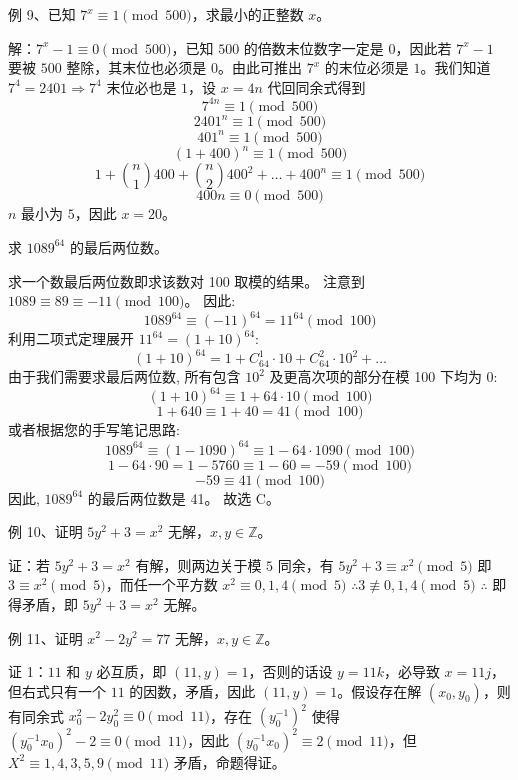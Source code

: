 \begin{questions}
\question 例 9、已知 $7^x \equiv 1 \pmod{500}$，求最小的正整数 $x$。

\begin{solution}
解：$7^x - 1 \equiv 0 \pmod{500}$，已知 $500$ 的倍数末位数字一定是 $0$，因此若 $7^x - 1$ 要被 $500$ 整除，其末位也必须是 $0$。由此可推出 $7^x$ 的末位必须是 $1$。我们知道 $7^4 = 2401 \Rightarrow 7^4$ 末位必也是 $1$，设 $x = 4n$ 代回同余式得到
\[ 7^{4n} \equiv 1 \pmod{500} \]
\[ 2401^n \equiv 1 \pmod{500} \]
\[ 401^n \equiv 1 \pmod{500} \]
\[ (1 + 400)^n \equiv 1 \pmod{500} \]
\[ 1 + \binom{n}{1}400 + \binom{n}{2}400^2 + \dots + 400^n \equiv 1 \pmod{500} \]
\[ 400n \equiv 0 \pmod{500} \]
$n$ 最小为 $5$，因此 $x = 20$。
\end{solution}

\question 求 $1089^{64}$ 的最后两位数。

\begin{solution}
求一个数最后两位数即求该数对 100 取模的结果。
注意到 $1089 \equiv 89 \equiv -11 \pmod{100}$。
因此:
\[
1089^{64} \equiv (-11)^{64} = 11^{64} \pmod{100}
\]
利用二项式定理展开 $11^{64} = (1 + 10)^{64}$:
\[
(1 + 10)^{64} = 1 + C_{64}^1 \cdot 10 + C_{64}^2 \cdot 10^2 + \dots
\]
由于我们需要求最后两位数, 所有包含 $10^2$ 及更高次项的部分在模 100 下均为 0:
\[
(1 + 10)^{64} \equiv 1 + 64 \cdot 10 \pmod{100}
\]
\[
1 + 640 \equiv 1 + 40 = 41 \pmod{100}
\]
或者根据您的手写笔记思路:
\[
1089^{64} \equiv (1 - 1090)^{64} \equiv 1 - 64 \cdot 1090 \pmod{100}
\]
\[
1 - 64 \cdot 90 = 1 - 5760 \equiv 1 - 60 = -59 \pmod{100}
\]
\[
-59 \equiv 41 \pmod{100}
\]
因此, $1089^{64}$ 的最后两位数是 41。
故选 C。
\end{solution}

\question 例 10、证明 $5y^2 + 3 = x^2$ 无解，$x, y \in \mathbb{Z}$。

\begin{solution}
证：若 $5y^2 + 3 = x^2$ 有解，则两边关于模 $5$ 同余，有 $5y^2 + 3 \equiv x^2 \pmod 5$
即 $3 \equiv x^2 \pmod 5$，而任一个平方数 $x^2 \equiv 0, 1, 4 \pmod 5$
$\therefore 3 \not\equiv 0, 1, 4 \pmod 5$ $\therefore$ 即得矛盾，即 $5y^2 + 3 = x^2$ 无解。
\end{solution}

\question 例 11、证明 $x^2 - 2y^2 = 77$ 无解，$x, y \in \mathbb{Z}$。

\begin{solution}
证 1：$11$ 和 $y$ 必互质，即 $(11, y) = 1$，否则的话设 $y = 11k$，必导致 $x = 11j$，但右式只有一个 $11$ 的因数，矛盾，因此 $(11, y) = 1$。假设存在解 $(x_0, y_0)$，则有同余式
$x_0^2 - 2y_0^2 \equiv 0 \pmod{11}$，存在 $(y_0^{-1})^2$ 使得 $(y_0^{-1}x_0)^2 - 2 \equiv 0 \pmod{11}$，因此
$(y_0^{-1}x_0)^2 \equiv 2 \pmod{11}$，但 $X^2 \equiv 1, 4, 3, 5, 9 \pmod{11}$ 矛盾，命题得证。


\end{solution}
\end{questions}
